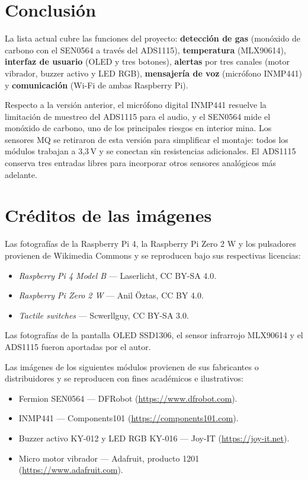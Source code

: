 \documentclass[11pt,a4paper]{article}
\begin{document}
\section{Conclusión}

La lista actual cubre las funciones del proyecto: \textbf{detección de gas}
(monóxido de carbono con el SEN0564 a través del ADS1115), \textbf{temperatura}
(MLX90614), \textbf{interfaz de usuario} (OLED y tres botones), \textbf{alertas}
por tres canales (motor vibrador, buzzer activo y LED RGB), \textbf{mensajería
de voz} (micrófono INMP441) y \textbf{comunicación} (Wi-Fi de ambas Raspberry
Pi).

Respecto a la versión anterior, el micrófono digital INMP441 resuelve la
limitación de muestreo del ADS1115 para el audio, y el SEN0564 mide el monóxido
de carbono, uno de los principales riesgos en interior mina. Los sensores MQ se
retiraron de esta versión para simplificar el montaje: todos los módulos
trabajan a 3{,}3\,V y se conectan sin resistencias adicionales. El ADS1115
conserva tres entradas libres para incorporar otros sensores analógicos más
adelante.

\section*{Créditos de las imágenes}
\small
Las fotografías de la Raspberry Pi 4, la Raspberry Pi Zero 2 W y los pulsadores
provienen de Wikimedia Commons y se reproducen bajo sus respectivas licencias:

\begin{itemize}[nosep]
  \item \textit{Raspberry Pi 4 Model B} --- Laserlicht, CC BY-SA 4.0.
  \item \textit{Raspberry Pi Zero 2 W} --- Anil Öztas, CC BY 4.0.
  \item \textit{Tactile switches} --- Scwerllguy, CC BY-SA 3.0.
\end{itemize}

Las fotografías de la pantalla OLED SSD1306, el sensor infrarrojo MLX90614 y el
ADS1115 fueron aportadas por el autor.

Las imágenes de los siguientes módulos provienen de sus fabricantes o
distribuidores y se reproducen con fines académicos e ilustrativos:

\begin{itemize}[nosep]
  \item Fermion SEN0564 --- DFRobot (\url{https://www.dfrobot.com}).
  \item INMP441 --- Components101 (\url{https://components101.com}).
  \item Buzzer activo KY-012 y LED RGB KY-016 --- Joy-IT (\url{https://joy-it.net}).
  \item Micro motor vibrador --- Adafruit, producto 1201 (\url{https://www.adafruit.com}).
\end{itemize}
\end{document}
